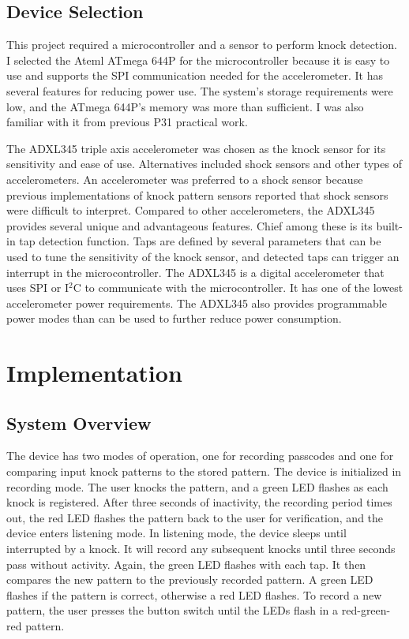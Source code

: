 \documentclass[conference]{./IEEEtran}
\begin{document}
\subsection{Device Selection}
This project required a microcontroller and a sensor to perform knock detection. I selected the Ateml ATmega 644P for the microcontroller because it is easy to use and supports the SPI communication needed for the accelerometer. It has several features for reducing power use. The system's storage requirements were low, and the ATmega 644P's memory was more than sufficient. I was also familiar with it from previous P31 practical work. 

The ADXL345 triple axis accelerometer was chosen as the knock sensor for its sensitivity and ease of use. Alternatives included shock sensors and other types of accelerometers. An accelerometer was preferred to a shock sensor because previous implementations of knock pattern sensors reported that shock sensors were difficult to interpret. Compared to other accelerometers, the ADXL345 provides several unique and advantageous features. Chief among these is its built-in tap detection function. Taps are defined by several parameters that can be used to tune the sensitivity of the knock sensor, and detected taps can trigger an interrupt in the microcontroller. The ADXL345 is a digital accelerometer that uses SPI or I$^2$C to communicate with the microcontroller. It has one of the lowest accelerometer power requirements. The ADXL345 also provides programmable power modes than can be used to further reduce power consumption.  


\section{Implementation}
\subsection{System Overview}
The device has two modes of operation, one for recording passcodes and one for comparing input knock patterns to the stored pattern. The device is initialized in recording mode. The user knocks the pattern, and a green LED flashes as each knock is registered. After three seconds of inactivity, the recording period times out, the red LED flashes the pattern back to the user for verification, and the device enters listening mode. In listening mode, the device sleeps until interrupted by a knock. It will record any subsequent knocks until three seconds pass without activity. Again, the green LED flashes with each tap. It then compares the new pattern to the previously recorded pattern. A green LED flashes if the pattern is correct, otherwise a red LED flashes. To record a new pattern, the user presses the button switch until the LEDs flash in a red-green-red pattern. 
\end{document}

